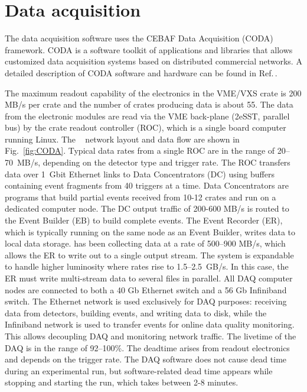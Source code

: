 
\section[Data Acquisition]{Data acquisition \label{sec:daq}}



The \gx{} data acquisition software uses the CEBAF Data Acquisition (CODA) framework. CODA is a software toolkit of applications and libraries that allows customized data acquisition systems based on distributed commercial networks. A detailed description of CODA software and hardware can be found in Ref.\,\cite{CLAS12DAQ}. 

The maximum readout capability of the electronics in the VME/VXS crate is 200 MB/s per crate and the number of crates producing data is about 55.
The data from the electronic modules are read via the VME back-plane (2eSST, parallel bus) by the crate readout controller (ROC), which is a single board computer running Linux.
The \gx~ network layout and data flow are shown in Fig.~\ref{fig:CODA}.
Typical data rates from a single ROC are in the range of 20--70~MB/s, depending on the detector type and trigger rate.
The ROC transfers data over 1~Gbit Ethernet links to Data Concentrators (DC) using buffers containing event fragments from 40 triggers at a time. Data Concentrators are programs that build partial events received from 10-12 crates and run on a dedicated computer node.
The DC output traffic of 200-600 MB/s is routed to the Event Builder (EB) to build complete events.
The Event Recorder (ER), which is typically running on the same node as an Event Builder, writes data to local data storage.
\gx{} has been collecting data at a rate of 500--900 MB/s, which allows the ER to write out to a single output stream. The system is expandable to handle higher luminosity where rates rise to 1.5--2.5~GB/s. In this case, the ER must write multi-stream data to several files in parallel.
All DAQ computer nodes are connected to both a 40 Gb Ethernet switch and a 56 Gb Infiniband switch.
The Ethernet network is used exclusively for DAQ purposes: receiving data from detectors, building events, and writing data to disk, 
while the Infiniband network is used to transfer events for online data quality monitoring. 
This allows decoupling DAQ and monitoring network traffic.
The livetime of the DAQ is in the range of 92--100\%. The deadtime arises from readout electronics and depends on the trigger rate.  
The DAQ software does not cause dead time during an experimental run, but software-related dead time appears while stopping and starting the run, which takes between 2-8 minutes. 

